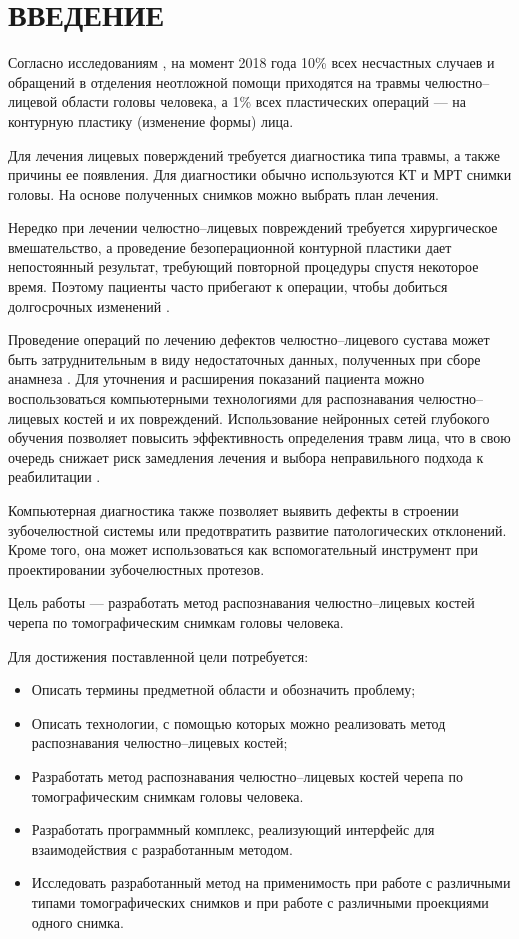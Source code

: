\section*{ВВЕДЕНИЕ}

Согласно исследованиям \cite{facialfracs0}\cite{isaps}, на момент 2018 года 10\% всех несчастных случаев и обращений в отделения неотложной помощи приходятся на травмы челюстно--лицевой области головы человека, а 1\% всех пластических операций --- на контурную пластику (изменение формы) лица.

Для лечения лицевых поверждений требуется диагностика типа травмы, а также причины ее появления. Для диагностики обычно используются КТ и МРТ снимки головы. На основе полученных снимков можно выбрать план лечения.

Нередко при лечении челюстно--лицевых повреждений требуется хирургическое вмешательство, а проведение безоперационной контурной пластики дает непостоянный результат, требующий повторной процедуры спустя некоторое время. Поэтому пациенты часто прибегают к операции, чтобы добиться долгосрочных изменений \cite{isaps}.

Проведение операций по лечению дефектов челюстно--лицевого сустава может быть затруднительным в виду недостаточных данных, полученных при сборе анамнеза \cite{facialfracs1}. Для уточнения и расширения показаний пациента можно воспользоваться компьютерными технологиями для распознавания челюстно--лицевых костей и их повреждений. Использование нейронных сетей глубокого обучения позволяет повысить эффективность определения травм лица, что в свою очередь снижает риск замедления лечения и выбора неправильного подхода к реабилитации \cite{facialfracs2}.

Компьютерная диагностика также позволяет выявить дефекты в строении зубочелюстной системы или предотвратить развитие патологических отклонений. Кроме того, она может использоваться как вспомогательный инструмент при проектировании зубочелюстных протезов.

Цель работы --- разработать метод распознавания челюстно--лицевых костей черепа по томографическим снимкам головы человека.

Для достижения поставленной цели потребуется:
\begin{itemize}
\item Описать термины предметной области и обозначить проблему;
\item Описать технологии, с помощью которых можно реализовать метод распознавания челюстно--лицевых костей;
\item Разработать метод распознавания челюстно--лицевых костей черепа по томографическим снимкам головы человека.
\item Разработать программный комплекс, реализующий интерфейс для взаимодействия с разработанным методом.
\item Исследовать разработанный метод на применимость при работе с различными типами томографических снимков и при работе с различными проекциями одного снимка.
\end{itemize}